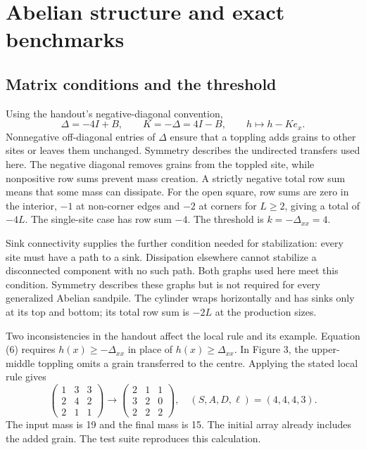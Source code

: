\chapter{Abelian structure and exact benchmarks}\label{sec:theory}
\section{Matrix conditions and the threshold}\label{sec:matrix}
Using the handout's negative-diagonal convention,
\begin{equation}
 \Delta=-4I+B,\qquad K=-\Delta=4I-B,\qquad h\longmapsto h-Ke_x.\label{eq:matrix}
\end{equation}
Nonnegative off-diagonal entries of $\Delta$ ensure that a toppling adds grains to other sites or leaves them unchanged. Symmetry describes the undirected transfers used here. The negative diagonal removes grains from the toppled site, while nonpositive row sums prevent mass creation. A strictly negative total row sum means that some mass can dissipate. For the open square, row sums are zero in the interior, $-1$ at non-corner edges and $-2$ at corners for $L\geq2$, giving a total of $-4L$. The single-site case has row sum $-4$. The threshold is $k=-\Delta_{xx}=4$.

Sink connectivity supplies the further condition needed for stabilization: every site must have a path to a sink. Dissipation elsewhere cannot stabilize a disconnected component with no such path. Both graphs used here meet this condition. Symmetry describes these graphs but is not required for every generalized Abelian sandpile. The cylinder wraps horizontally and has sinks only at its top and bottom; its total row sum is $-2L$ at the production sizes.

Two inconsistencies in the handout affect the local rule and its example. Equation (6) requires $h(x)\geq-\Delta_{xx}$ in place of $h(x)\geq\Delta_{xx}$. In Figure 3, the upper-middle toppling omits a grain transferred to the centre. Applying the stated local rule gives
\begin{equation}
 \begin{pmatrix}1&3&3\\2&4&2\\2&1&1\end{pmatrix}
 \longrightarrow
 \begin{pmatrix}2&1&1\\3&2&0\\2&2&2\end{pmatrix},
 \quad (S,A,D,\ell)=(4,4,4,3).
\end{equation}
The input mass is 19 and the final mass is 15. The initial array already includes the added grain. The test suite reproduces this calculation.

